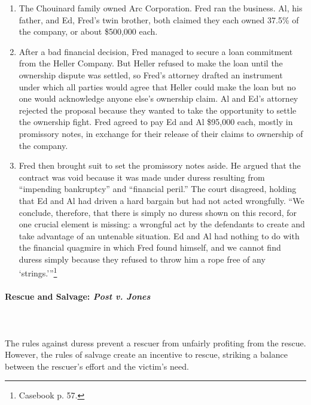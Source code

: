 \begin{enumerate}
    \item The Chouinard family owned Arc Corporation. Fred ran the business. 
    Al, his father, and Ed, Fred's twin brother, both claimed they each owned 
    37.5\% of the company, or about \$500,000 each.
    \item After a bad financial decision, Fred managed to secure a loan 
    commitment from the Heller Company. But Heller refused to make the loan 
    until the ownership dispute was settled, so Fred's attorney drafted an 
    instrument under which all parties would agree that Heller could make the 
    loan but no one would acknowledge anyone else's ownership claim. Al and 
    Ed's attorney rejected the proposal because they wanted to take the 
    opportunity to settle the ownership fight. Fred agreed to pay Ed and Al 
    \$95,000 each, mostly in promissory notes, in exchange for their release 
    of their claims to ownership of the company.
    \item Fred then brought suit to set the promissory notes aside. He argued 
    that the contract was void because it was made under duress resulting from 
    ``impending bankruptcy'' and ``financial peril.'' The court disagreed, 
    holding that Ed and Al had driven a hard bargain but had not acted 
    wrongfully. \enquote{We conclude, therefore, that there is simply no 
    duress shown on this record, for one crucial element is missing: a 
    wrongful act by the defendants to create and take advantage of an 
    untenable situation. Ed and Al had nothing to do with the financial 
    quagmire in which Fred found himself, and we cannot find duress simply 
    because they refused to throw him a rope free of any 
    \enquote{strings.}}\footnote{Casebook p. 57.}
\end{enumerate}

\paragraph{Rescue and Salvage: \emph{Post v. Jones}}
~\\\\
The rules against duress prevent a rescuer from unfairly profiting from the 
rescue. However, the rules of salvage create an incentive to rescue, striking 
a balance between the rescuer's effort and the victim's need.

